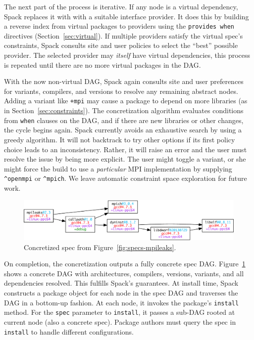 The next part of the process is iterative.
If any node is a virtual dependency, Spack replaces it with with a
suitable interface provider.  It does this by building a reverse
index from virtual packages to providers using the {\tt provides when}
directives (Section~\ref{sec:virtual}). If multiple providers
satisfy the virtual spec's constraints,
Spack consults site and user policies to select the ``best'' possible
provider.  The selected provider may {\it itself} have virtual dependencies,
this process is repeated until there are no more virtual packages in the DAG.

With the now non-virtual DAG, Spack again consults site and user preferences for
variants, compilers, and versions to resolve any remaining abstract nodes.
Adding a variant like {\tt +mpi} may cause a package to depend on more
libraries (as in Section~\ref{sec:constraints}). The concretization algorithm
evaluates conditions from {\tt when} clauses on the DAG, and if there are
new libraries or other changes, the cycle begins again.
Spack currently avoids an exhaustive search by using a greedy algorithm.
It will not backtrack to try other options if its first policy choice leads
to an inconsistency.  Rather, it will raise an error and the user must resolve
the issue by being more explicit.  The user might toggle a variant, or she might
force the build to use a {\it particular} MPI implementation
by supplying \verb|^openmpi| or \verb|^mpich|.  We leave automatic constraint
space exploration for future work.


\begin{figure}
	\centering
	\includegraphics[width=\columnwidth]{specs/mpileaks-concrete.pdf}
	\caption{
		Concretized spec from Figure~\ref{fig:specs-mpileaks}.
		\label{fig:specs-mpileaks-concrete}
	}
\end{figure}
On completion, the concretization outputs a fully concrete spec DAG.
Figure~\ref{fig:specs-mpileaks-concrete} shows a concrete DAG with architectures,
compilers, versions, variants, and all dependencies resolved.
This fulfills Spack's guarantees.
%
At install time, Spack constructs a package object for each node in the spec DAG
and traverses the DAG in a bottom-up fashion.  At each node, it invokes the package's
{\tt install} method.  For the {\tt spec} parameter to {\tt install}, it passes
a sub-DAG rooted at current node (also a concrete spec).  Package authors must
query the spec in {\tt install} to handle different configurations.

